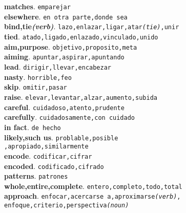 \documentclass[twocolumn]{article}
\begin{document}
	\textsf{\textbf{matches}}. \texttt{emparejar}\\
	\textsf{\textbf{elsewhere}}. \texttt{en otra parte,donde sea}\\
	\textsf{\textbf{bind,tie{\scriptsize \textsl{(verb)}}}}. \texttt{lazo,enlazar,ligar,atar{\scriptsize \textsl{(tie)}},unir}\\
	\textsf{\textbf{tied}}. \texttt{atado,ligado,enlazado,vinculado,unido}\\
	\textsf{\textbf{aim,purpose}}. \texttt{objetivo,proposito,meta}\\
	\textsf{\textbf{aiming}}. \texttt{apuntar,aspirar,apuntando}\\
	\textsf{\textbf{lead}}. \texttt{dirigir,llevar,encabezar}\\
	\textsf{\textbf{nasty}}. \texttt{horrible,feo}\\
	\textsf{\textbf{skip}}. \texttt{omitir,pasar}\\
	\textsf{\textbf{raise}}. \texttt{elevar,levantar,alzar,aumento,subida}\\
	\textsf{\textbf{careful}}. \texttt{cuidadoso,atento,prudente}\\
	\textsf{\textbf{carefully}}. \texttt{cuidadosamente,con cuidado}\\
	\textsf{\textbf{in fact}}. \texttt{de hecho}\\
	\textsf{\textbf{likely,such us}}. \texttt{problable,posible\\,apropiado,similarmente}\\
	\textsf{\textbf{encode}}. \texttt{codificar,cifrar}\\
	\textsf{\textbf{encoded}}. \texttt{codificado,cifrado}\\
	\textsf{\textbf{patterns}}. \texttt{patrones}\\
	\textsf{\textbf{whole,entire,complete}}. \texttt{entero,completo,todo,total}\\
	\textsf{\textbf{approach}}. \texttt{enfocar,acercarse a,aproximarse{\scriptsize \textsl{(verb)}},\\enfoque,criterio,perspectiva{\scriptsize \textsl{(noun)}}}\\
\end{document}
